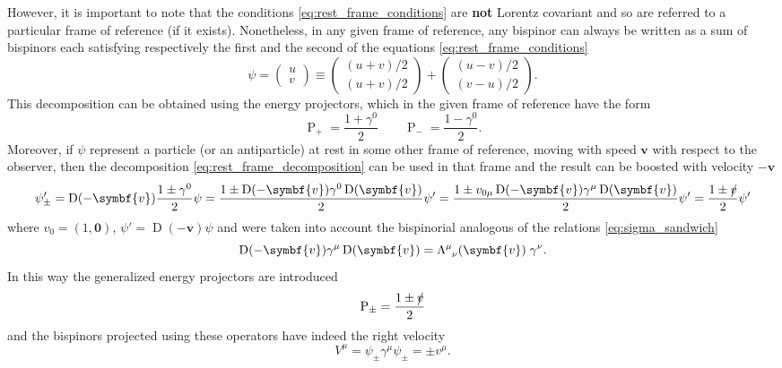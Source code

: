 However, it is important to note that the conditions \eqref{eq:rest_frame_conditions} are \textbf{not} Lorentz covariant and so are referred to a particular frame of reference (if it exists). Nonetheless, in any given frame of reference, any bispinor can always be written as a sum of bispinors each satisfying respectively the first and the second of the equations \eqref{eq:rest_frame_conditions}
\begin{equation}
  \psi = \begin{pmatrix} u \\ v \end{pmatrix} \equiv \begin{pmatrix} (u + v)/2 \\ (u + v)/2 \end{pmatrix} + \begin{pmatrix} (u - v)/2 \\ (v - u)/2 \end{pmatrix} .
  \label{eq:rest_frame_decomposition}
\end{equation}
This decomposition can be obtained using the energy projectors, which in the given frame of reference have the form
\begin{equation}
  \operatorname{P}_+ = \frac{1 + \gamma^0}{2} \qquad \operatorname{P}_- = \frac{1 - \gamma^0}{2} .
  \label{eq:energy_projectors_rest}
\end{equation}
Moreover, if $\psi$ represent a particle (or an antiparticle) at rest in some other frame of reference, moving with speed $\symbf{v}$ with respect to the observer, then the decomposition \eqref{eq:rest_frame_decomposition} can be used in that frame and the result can be boosted with velocity $-\symbf{v}$
\begin{equation}
  \psi^\prime_\pm = \operatorname{D}(-\symbf{v}) \frac{1 \pm \gamma^0}{2} \psi = \frac{1 \pm \operatorname{D}(-\symbf{v}) \gamma^0 \operatorname{D}(\symbf{v})}{2} \psi' = \frac{1 \pm v_{0 \mu} \operatorname{D}(-\symbf{v}) \gamma^\mu \operatorname{D}(\symbf{v})}{2} \psi' = \frac{1 \pm \slashed{v}}{2} \psi' 
\end{equation}
where $v_0 = (1,\symbf{0})$, $\psi' = \operatorname{D}(-\symbf{v}) \psi$ and were taken into account the bispinorial analogous of the relations \eqref{eq:sigma_sandwich}
\begin{equation}
  \operatorname{D}(-\symbf{v}) \gamma^\mu \operatorname{D}(\symbf{v}) = \Lambda\indices{^\mu_\nu}(\symbf{v}) \; \gamma^\nu .
\end{equation}
In this way the generalized energy projectors are introduced
\begin{equation}
  \operatorname{P}_\pm = \frac{1 \pm \slashed{v}}{2} 
\end{equation}
and the bispinors projected using these operators have indeed the right velocity
\begin{equation}
  V^\mu = \psi_\pm \gamma^\mu \psi_\pm = \pm v^\mu .
\end{equation}

